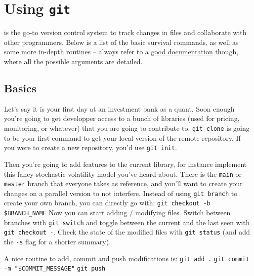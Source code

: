 \section{Using \texttt{git}}

\begin{tcolorbox}[width=\linewidth, sharp corners=all, colback=white!95!black]
     is the go-to version control system to track changes in files and collaborate with other programmers.
    Below is a list of the basic survival commands, as well as some more in-depth routines -- always refer to a \href{https://git-scm.com/docs}{good documentation} though, where all the possible arguments are detailed.
\end{tcolorbox}

\subsection*{Basics}

Let's say it is your first day at an investment bank as a quant. Soon enough you're going to get developper access to a bunch of libraries (used for pricing, monitoring, or whatever) that you are going to contribute to.\newline
\texttt{git clone}\newline
is going to be your first command to get your local version of the remote repository. If you were to create a new repository, you'd use \texttt{git init}.

Then you're going to add features to the current library, for instance implement this fancy stochastic volatility model you've heard about. There is the \texttt{main} or \texttt{master} branch that everyone takes as reference, and you'll want to create your changes on a parallel version to not interfere. Instead of using \texttt{git branch} to create your own branch, you can directly go with:\newline
\texttt{git checkout -b \$BRANCH_NAME}\newline
Now you can start adding / modifying files. Switch between branches with \texttt{git switch} and toggle between the current and the last seen with \texttt{git checkout -}. Check the state of the modified files with \texttt{git status} (and add the \texttt{-s} flag for a shorter summary).

A nice routine to add, commit and push modifications is:\newline
\texttt{git add .}\newline
\texttt{git commit -m "\$COMMIT_MESSAGE"}\newline
\texttt{git push}

